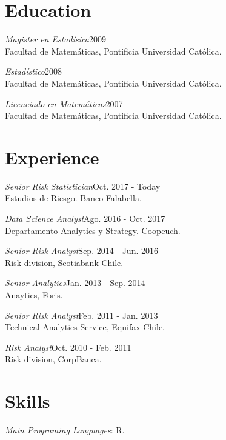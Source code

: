 \documentclass[margin]{res}
\begin{document}
\begin{resume}

\section{Education}

    {\sl Magister en Estadísica}\hfill 2009\\
    Facultad de Matemáticas, Pontificia Universidad Católica.

    {\sl Estadístico}\hfill 2008\\
    Facultad de Matemáticas, Pontificia Universidad Católica.

    {\sl Licenciado en Matemáticas}\hfill 2007\\
    Facultad de Matemáticas, Pontificia Universidad Católica.

\vspace{1cm}

\section{Experience}

     {\sl Senior Risk Statistician}\hfill Oct. 2017 - Today\\
        Estudios de Riesgo. Banco Falabella.

     {\sl Data Science Analyst}\hfill Ago. 2016 - Oct. 2017\\
        Departamento Analytics y Strategy. Coopeuch.

    {\sl Senior Risk Analyst}\hfill Sep. 2014 - Jun. 2016\\
        Risk division, Scotiabank Chile.

    {\sl Senior Analytics}\hfill Jan. 2013 - Sep. 2014\\
        Anaytics, Foris.

    {\sl Senior Risk Analyst}\hfill Feb. 2011 - Jan. 2013\\
        Technical Analytics Service, Equifax Chile.

    {\sl Risk Analyst}\hfill Oct. 2010 - Feb. 2011\\
        Risk division, CorpBanca.

\vspace{1cm}

\section{Skills}

    {\sl Main Programing Languages}: R.


\end{resume}
\end{document}
